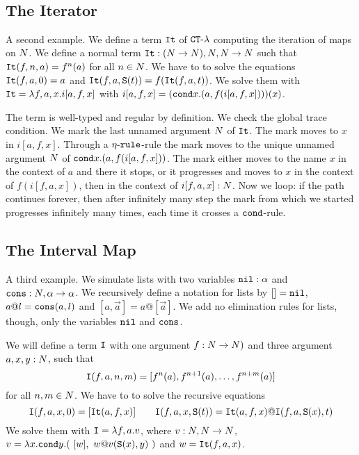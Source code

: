 \documentclass{article}
\begin{document}
\\


\subsection{The Iterator}
A second example. We define a term ${\tt It}$ of  ${ {\tt CT} \mbox{-} \lambda}$ computing the iteration of maps on ${N}$.
We define a normal term ${\tt It}:({N} \rightarrow {N}), {N},{N} \rightarrow {N}$ such that
${\tt It}(f,n,a)=f^n(a)$ for all $n \in {N}$. 
We have to to solve the equations ${\tt It}(f,a,0) = a$ and ${\tt It}(f,a,{\tt S} (t)) = f({\tt It}(f,a,t))$.
We solve them with ${\tt It} = \lambda f, a, x. i[a,f,x]$
with $ i[a,f,x] = ({\tt cond} x. (a, f( i[a,f,x]) ))(x)$.

The term is well-typed and regular by definition. We check the global trace condition. 
We mark the last unnamed argument ${N}$ of ${\tt It}$. The mark moves to $x$ in $ i[a,f,x]$.
 Through a ${\eta\mbox{-}\tt rule}$-rule the mark moves to the unique unnamed argument ${N}$ of  
$ {\tt cond} x. (a, f( i[a,f,x]) )$.
The mark either moves to the name $x$ in the context of $a$ and there it stops, or 
it progresses and moves to $x$ in the context of $f(i[f,a,x])$, then in the context of $i[f,a,x]:{N}$.
Now we loop: if the path continues forever, then after infinitely many step the mark from which we started 
progresses infinitely many times, each time it crosses a ${\tt cond}$-rule.



\subsection{The Interval Map}
A third example. We simulate lists with two variables ${\tt nil}:\alpha$ and 
${\tt cons}:{N},\alpha \rightarrow \alpha$. We recursively define a notation for lists by $[]={\tt nil}$,
$a @ l={\tt cons}(a,l)$ and $[a,\vec{a}] = a @ [\vec{a}]$. We add no elimination rules for lists, though,
only the variables ${\tt nil}$ and ${\tt cons}$.

We will define a term ${\tt I}$ with one argument $f:{N} \rightarrow {N})$ and three argument
$a,x,y:{N}$, such that 
$$
{\tt I}(f,a,n,m) = [f^n(a), f^{n+1}(a), \ldots, f^{n+m}(a)]
$$ 
for all $n,m \in {N}$. 
We have to to solve the recursive equations 
$$
\Interval(f,a,x,0) = [\Iter(a,f,x)]
\ \ \ \ \ \ 
\Interval(f,a,x,\Succ (t)) = \Iter(a,f,x) @ \Interval(f,a,\Succ(x),t)
$$ 
We solve them with ${\tt I} = \lambda f,a.v$,
where $v:{N},{N}\rightarrow {N}$, 
$v = \lambda x.{\tt cond} y. (\ [w],  \  w @ v({\tt S} (x),y) \ )$ and $w={\tt It}(f,a,x)$.
\end{document}

